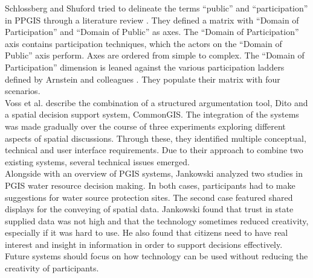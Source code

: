 Schlossberg and Shuford tried to delineate the terms ``public'' and ``participation'' in PPGIS through a literature review \cite{Schlossberg2005_PPGIS}. They defined a matrix with ``Domain of Participation'' and ``Domain of Public'' as axes. The ``Domain of Participation'' axis contains participation techniques, which the actors on the ``Domain of Public'' axis perform. Axes are ordered from simple to complex. The ``Domain of Participation'' dimension is leaned against the various participation ladders defined by Arnstein and colleagues \cite{Arnstein1969_citizen_participation,Wiedemann1993355,Connor1988_new_ladder}. They populate their matrix with four scenarios.\\
Voss et al. \cite{Voss2004_Evolution_PGIS} describe the combination of a structured argumentation tool, Dito and a spatial decision support system, CommonGIS. The integration of the systems was made gradually over the course of three experiments exploring different aspects of spatial discussions. Through these, they identified multiple conceptual, technical and user interface requirements. Due to their approach to combine two existing systems, several technical issues emerged.\\
Alongside with an overview of PGIS systems, Jankowski \cite{Jankowski2005_community_based_pgis} analyzed two studies in PGIS water resource decision making. In both cases, participants had to make suggestions for water source protection sites. The second case featured shared displays for the conveying of spatial data. Jankowski found that trust in state supplied data was not high and that the technology sometimes reduced creativity, especially if it was hard to use. He also found that citizens need to have real interest and insight in information in order to support decisions effectively. Future systems should focus on how technology can be used without reducing the creativity of participants.

